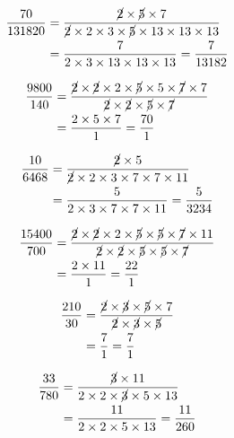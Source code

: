 {{\item\begin{align*}
    \frac{70}{131820} &=
    \frac{\cancel{2} \times \cancel{5} \times 7}
    {\cancel{2} \times 2 \times 3 \times \cancel{5} \times 13 \times 13 \times 13}\\ &=
    \frac{7}
    {2 \times 3 \times 13 \times 13 \times 13} =
    \frac{7}{13182}
    \end{align*}

\item\begin{align*}
    \frac{9800}{140} &=
    \frac{\cancel{2} \times \cancel{2} \times 2 \times \cancel{5} \times 5 \times \cancel{7} \times 7}
    {\cancel{2} \times \cancel{2} \times \cancel{5} \times \cancel{7}}\\ &=
    \frac{2 \times 5 \times 7}
    {1} =
    \frac{70}{1}
    \end{align*}

\item\begin{align*}
    \frac{10}{6468} &=
    \frac{\cancel{2} \times 5}
    {\cancel{2} \times 2 \times 3 \times 7 \times 7 \times 11}\\ &=
    \frac{5}
    {2 \times 3 \times 7 \times 7 \times 11} =
    \frac{5}{3234}
    \end{align*}

\item\begin{align*}
    \frac{15400}{700} &=
    \frac{\cancel{2} \times \cancel{2} \times 2 \times \cancel{5} \times \cancel{5} \times \cancel{7} \times 11}
    {\cancel{2} \times \cancel{2} \times \cancel{5} \times \cancel{5} \times \cancel{7}}\\ &=
    \frac{2 \times 11}
    {1} =
    \frac{22}{1}
    \end{align*}

\item\begin{align*}
    \frac{210}{30} &=
    \frac{\cancel{2} \times \cancel{3} \times \cancel{5} \times 7}
    {\cancel{2} \times \cancel{3} \times \cancel{5}}\\ &=
    \frac{7}
    {1} =
    \frac{7}{1}
    \end{align*}

\item\begin{align*}
    \frac{33}{780} &=
    \frac{\cancel{3} \times 11}
    {2 \times 2 \times \cancel{3} \times 5 \times 13}\\ &=
    \frac{11}
    {2 \times 2 \times 5 \times 13} =
    \frac{11}{260}
    \end{align*}

}}
